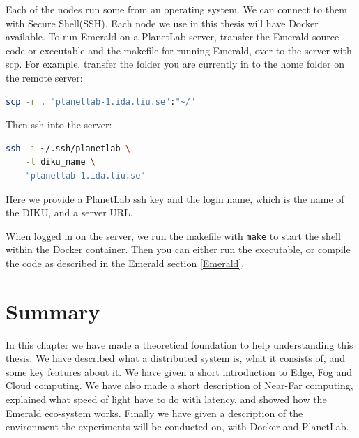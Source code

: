 Each of the nodes run some from an operating system. We can connect to them with Secure Shell(SSH). Each node we use in this thesis will have Docker available. To run Emerald on a PlanetLab server, transfer the Emerald source code or executable and the makefile for running Emerald, over to the server with scp. For example, transfer the folder you are currently in to the home folder on the remote server:
\begin{lstlisting}[language=Bash]
scp -r . "planetlab-1.ida.liu.se":"~/"
\end{lstlisting}
Then ssh into the server: 
\begin{lstlisting}[language=Bash]
ssh -i ~/.ssh/planetlab \
    -l diku_name \
    "planetlab-1.ida.liu.se"
\end{lstlisting}
Here we provide a PlanetLab ssh key and the login name, which is the name of the DIKU, and a server URL.

When logged in on the server, we run the makefile with \verb|make| to start the shell within the Docker container. Then you can either run the executable, or compile the code as described in the Emerald section \ref{Emerald}.



\section{Summary}
In this chapter we have made a theoretical foundation to help understanding this thesis. We have described what a distributed system is, what it consists of, and some key features about it. We have given a short introduction to Edge, Fog and Cloud computing. We have also made a short description of Near-Far computing, explained what speed of light have to do with latency, and showed how the Emerald eco-system works. Finally we have given a description of the environment the experiments will be conducted on, with Docker and PlanetLab.





